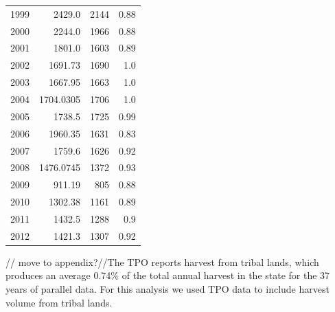 \documentclass[a4paper]{article}
\begin{document}
\begin{longtable}{rrrr}
1999 & 2429.0 & 2144 & 0.88\\
2000 & 2244.0 & 1966 & 0.88\\
2001 & 1801.0 & 1603 & 0.89\\
2002 & 1691.73 & 1690 & 1.0\\
2003 & 1667.95 & 1663 & 1.0\\
2004 & 1704.0305 & 1706 & 1.0\\
2005 & 1738.5 & 1725 & 0.99\\
2006 & 1960.35 & 1631 & 0.83\\
2007 & 1759.6 & 1626 & 0.92\\
2008 & 1476.0745 & 1372 & 0.93\\
2009 & 911.19 & 805 & 0.88\\
2010 & 1302.38 & 1161 & 0.89\\
2011 & 1432.5 & 1288 & 0.9\\
2012 & 1421.3 & 1307 & 0.92\\
\end{longtable}

// move to appendix?//The TPO reports harvest from tribal lands, which produces an average 0.74\% of the total
annual harvest in the state for the 37 years of parallel data. For
this analysis we used TPO data to include harvest volume from tribal lands. 
\end{document}

